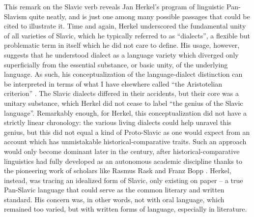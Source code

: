 \noindent This remark on the Slavic verb reveals Jan Herkel’s program of linguistic Pan-Slavism quite neatly, and is just one among many possible passages that could be cited to illustrate it. Time and again, Herkel underscored the fundamental unity of all varieties of Slavic, which he typically referred to as “dialects”, a flexible but problematic term in itself which he did not care to define. His usage, however, suggests that he understood dialect as a language variety which diverged only superficially from the essential substance, or basic unity, of the underlying language. As such, his conceptualization of the language-dialect distinction can be interpreted in terms of what I have elsewhere called “the Aristotelian criterion” \citep[109--124]{van_rooy_language_2020}. The Slavic dialects differed in their accidents, but their core was a unitary substance, which Herkel did not cease to label “the genius of the Slavic language”. Remarkably enough, for Herkel, this conceptualization did not have a strictly linear chronology: the various living dialects could help unravel this genius, but this did not equal a kind of Proto-Slavic as one would expect from an account which has unmistakable historical-comparative traits. Such an approach would only become dominant later in the century, after historical-comparative linguistics had fully developed as an autonomous academic discipline thanks to the pioneering work of scholars like Rasmus Rask and Franz Bopp \citep{swiggers_indo-european_2017}. Herkel, instead, was tracing an idealized form of Slavic, only existing on paper – a true Pan-Slavic language that could serve as the common literary and written standard. His concern was, in other words, not with oral language, which remained too varied, but with written forms of language, especially in literature.


